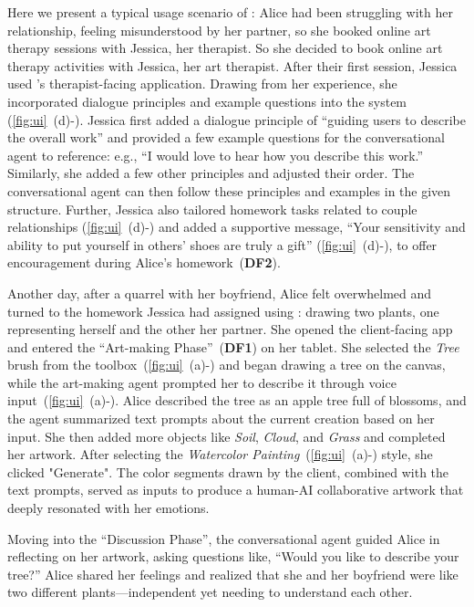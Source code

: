 Here we present a typical usage scenario of \name{}: Alice had been struggling with her relationship, feeling misunderstood by her partner, so she booked online art therapy sessions with Jessica, her therapist.
So she decided to book online art therapy activities with Jessica, her art therapist.
After their first session, Jessica used \name{}'s therapist-facing application.
Drawing from her experience, she incorporated dialogue principles and example questions into the system (\autoref{fig:ui}~(d)-). Jessica first added a dialogue principle of ``guiding users to describe the overall work'' and provided a few example questions for the conversational agent to reference: e.g., ``I would love to hear how you describe this work.'' Similarly, she added a few other principles and adjusted their order. The conversational agent can then follow these principles and examples in the given structure.
Further, Jessica also tailored homework tasks related to couple relationships (\autoref{fig:ui}~(d)-) and added a supportive message, ``Your sensitivity and ability to put yourself in others' shoes are truly a gift'' (\autoref{fig:ui}~(d)-), to offer encouragement during Alice's homework~(\textbf{DF2}).

Another day, after a quarrel with her boyfriend, Alice felt overwhelmed and turned to the homework Jessica had assigned using \name{}: drawing two plants, one representing herself and the other her partner. She opened the client-facing app and entered the ``Art-making Phase''~(\textbf{DF1}) on her tablet. She selected the \textit{Tree} brush from the toolbox~(\autoref{fig:ui}~(a)-) and began drawing a tree on the canvas, while the art-making agent prompted her to describe it through voice input~(\autoref{fig:ui}~(a)-). 
Alice described the tree as an apple tree full of blossoms, and the agent summarized text prompts about the current creation based on her input. 
She then added more objects like \textit{Soil}, \textit{Cloud}, and \textit{Grass} and completed her artwork. After selecting the \textit{Watercolor Painting}~(\autoref{fig:ui}~(a)-) style,
she clicked "Generate". The color segments drawn by the client, combined with the text prompts, served as inputs to produce a human-AI collaborative artwork that deeply resonated with her emotions.

Moving into the ``Discussion Phase'', the conversational agent guided Alice in reflecting on her artwork, asking questions like, ``Would you like to describe your tree?'' Alice shared her feelings and realized that she and her boyfriend were like two different plants—independent yet needing to understand each other.

